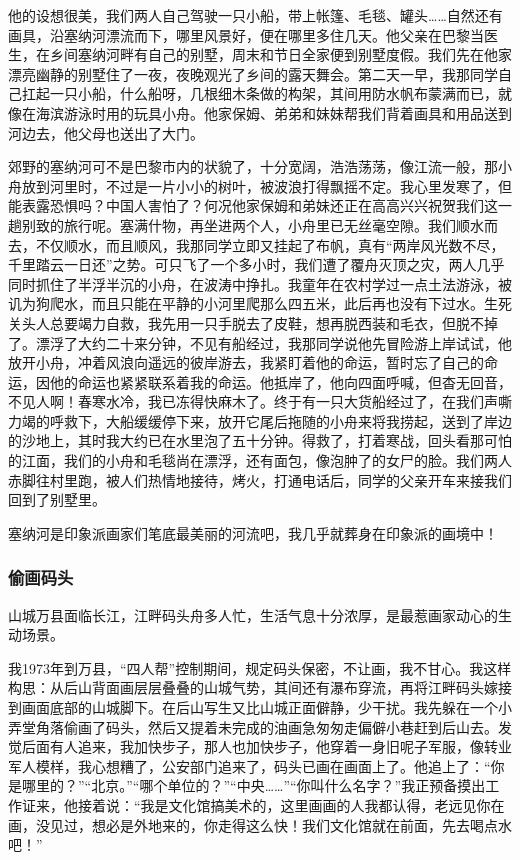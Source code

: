 \documentclass{article}
\begin{document}
他的设想很美，我们两人自己驾驶一只小船，带上帐篷、毛毯、罐头……自然还有画具，沿塞纳河漂流而下，哪里风景好，便在哪里多住几天。他父亲在巴黎当医生，在乡间塞纳河畔有自己的别墅，周末和节日全家便到别墅度假。我们先在他家漂亮幽静的别墅住了一夜，夜晚观光了乡间的露天舞会。第二天一早，我那同学自己扛起一只小船，什么船呀，几根细木条做的构架，其间用防水帆布蒙满而已，就像在海滨游泳时用的玩具小舟。他家保姆、弟弟和妹妹帮我们背着画具和用品送到河边去，他父母也送出了大门。

郊野的塞纳河可不是巴黎市内的状貌了，十分宽阔，浩浩荡荡，像江流一般，那小舟放到河里时，不过是一片小小的树叶，被波浪打得飘摇不定。我心里发寒了，但能表露恐惧吗？中国人害怕了？何况他家保姆和弟妹还正在高高兴兴祝贺我们这一趟别致的旅行呢。塞满什物，再坐进两个人，小舟里已无丝毫空隙。我们顺水而去，不仅顺水，而且顺风，我那同学立即又挂起了布帆，真有“两岸风光数不尽，千里踏云一日还”之势。可只飞了一个多小时，我们遭了覆舟灭顶之灾，两人几乎同时抓住了半浮半沉的小舟，在波涛中挣扎。我童年在农村学过一点土法游泳，被讥为狗爬水，而且只能在平静的小河里爬那么四五米，此后再也没有下过水。生死关头人总要竭力自救，我先用一只手脱去了皮鞋，想再脱西装和毛衣，但脱不掉了。漂浮了大约二十来分钟，不见有船经过，我那同学说他先冒险游上岸试试，他放开小舟，冲着风浪向遥远的彼岸游去，我紧盯着他的命运，暂时忘了自己的命运，因他的命运也紧紧联系着我的命运。他抵岸了，他向四面呼喊，但杳无回音，不见人啊！春寒水冷，我已冻得快麻木了。终于有一只大货船经过了，在我们声嘶力竭的呼救下，大船缓缓停下来，放开它尾后拖随的小舟来将我捞起，送到了岸边的沙地上，其时我大约已在水里泡了五十分钟。得救了，打着寒战，回头看那可怕的江面，我们的小舟和毛毯尚在漂浮，还有面包，像泡肿了的女尸的脸。我们两人赤脚往村里跑，被人们热情地接待，烤火，打通电话后，同学的父亲开车来接我们回到了别墅里。

塞纳河是印象派画家们笔底最美丽的河流吧，我几乎就葬身在印象派的画境中！
\subsubsection{偷画码头}
山城万县面临长江，江畔码头舟多人忙，生活气息十分浓厚，是最惹画家动心的生动场景。

我1973年到万县，“四人帮”控制期间，规定码头保密，不让画，我不甘心。我这样构思：从后山背面画层层叠叠的山城气势，其间还有瀑布穿流，再将江畔码头嫁接到画面底部的山城脚下。在后山写生又比山城正面僻静，少干扰。我先躲在一个小弄堂角落偷画了码头，然后又提着未完成的油画急匆匆走偏僻小巷赶到后山去。发觉后面有人追来，我加快步子，那人也加快步子，他穿着一身旧呢子军服，像转业军人模样，我心想糟了，公安部门追来了，码头已画在画面上了。他追上了：“你是哪里的？”“北京。”“哪个单位的？”“中央……”“你叫什么名字？”我正预备摸出工作证来，他接着说：“我是文化馆搞美术的，这里画画的人我都认得，老远见你在画，没见过，想必是外地来的，你走得这么快！我们文化馆就在前面，先去喝点水吧！”
\end{document}
